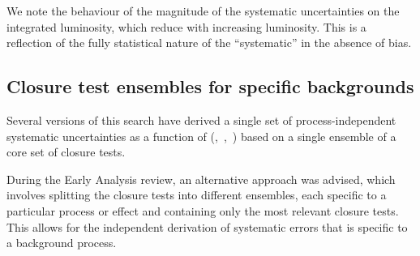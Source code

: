 We note the behaviour of the magnitude of the systematic uncertainties
on the integrated luminosity, which reduce with increasing
luminosity. This is a reflection of the fully statistical nature of
the ``systematic'' in the absence of bias.

\subsection{Closure test ensembles for specific backgrounds\label{sec:closure-split}}

Several versions of this search have derived a single set of
process-independent systematic uncertainties as a function of
(\njet,~\nb,~\scalht) based on a single ensemble of a core set of
closure tests. 

During the Early Analysis review, an alternative approach was advised,
which involves splitting the closure tests into different ensembles,
each specific to a particular process or effect and containing only
the most relevant closure tests. This allows for the independent
derivation of systematic errors that is specific to a background
process.


